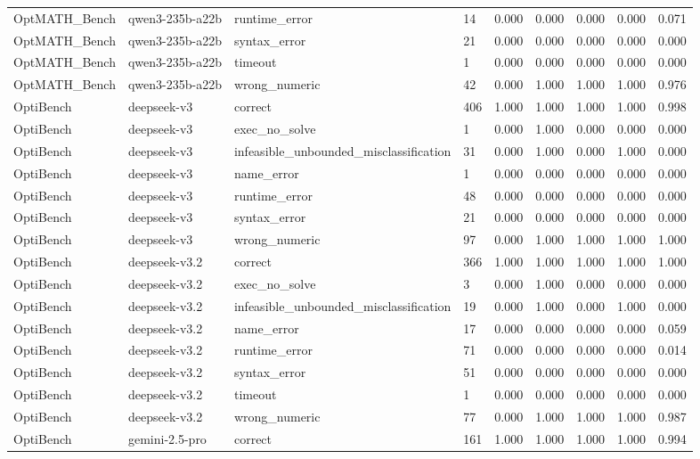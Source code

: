 \begin{table}[t]
\begin{tabular}{lllllllll}
OptMATH\_Bench & qwen3-235b-a22b & runtime\_error & 14 & 0.000 & 0.000 & 0.000 & 0.000 & 0.071 \\
OptMATH\_Bench & qwen3-235b-a22b & syntax\_error & 21 & 0.000 & 0.000 & 0.000 & 0.000 & 0.000 \\
OptMATH\_Bench & qwen3-235b-a22b & timeout & 1 & 0.000 & 0.000 & 0.000 & 0.000 & 0.000 \\
OptMATH\_Bench & qwen3-235b-a22b & wrong\_numeric & 42 & 0.000 & 1.000 & 1.000 & 1.000 & 0.976 \\
OptiBench & deepseek-v3 & correct & 406 & 1.000 & 1.000 & 1.000 & 1.000 & 0.998 \\
OptiBench & deepseek-v3 & exec\_no\_solve & 1 & 0.000 & 1.000 & 0.000 & 0.000 & 0.000 \\
OptiBench & deepseek-v3 & infeasible\_unbounded\_misclassification & 31 & 0.000 & 1.000 & 0.000 & 1.000 & 0.000 \\
OptiBench & deepseek-v3 & name\_error & 1 & 0.000 & 0.000 & 0.000 & 0.000 & 0.000 \\
OptiBench & deepseek-v3 & runtime\_error & 48 & 0.000 & 0.000 & 0.000 & 0.000 & 0.000 \\
OptiBench & deepseek-v3 & syntax\_error & 21 & 0.000 & 0.000 & 0.000 & 0.000 & 0.000 \\
OptiBench & deepseek-v3 & wrong\_numeric & 97 & 0.000 & 1.000 & 1.000 & 1.000 & 1.000 \\
OptiBench & deepseek-v3.2 & correct & 366 & 1.000 & 1.000 & 1.000 & 1.000 & 1.000 \\
OptiBench & deepseek-v3.2 & exec\_no\_solve & 3 & 0.000 & 1.000 & 0.000 & 0.000 & 0.000 \\
OptiBench & deepseek-v3.2 & infeasible\_unbounded\_misclassification & 19 & 0.000 & 1.000 & 0.000 & 1.000 & 0.000 \\
OptiBench & deepseek-v3.2 & name\_error & 17 & 0.000 & 0.000 & 0.000 & 0.000 & 0.059 \\
OptiBench & deepseek-v3.2 & runtime\_error & 71 & 0.000 & 0.000 & 0.000 & 0.000 & 0.014 \\
OptiBench & deepseek-v3.2 & syntax\_error & 51 & 0.000 & 0.000 & 0.000 & 0.000 & 0.000 \\
OptiBench & deepseek-v3.2 & timeout & 1 & 0.000 & 0.000 & 0.000 & 0.000 & 0.000 \\
OptiBench & deepseek-v3.2 & wrong\_numeric & 77 & 0.000 & 1.000 & 1.000 & 1.000 & 0.987 \\
OptiBench & gemini-2.5-pro & correct & 161 & 1.000 & 1.000 & 1.000 & 1.000 & 0.994 \\

\end{tabular}
\end{table}
